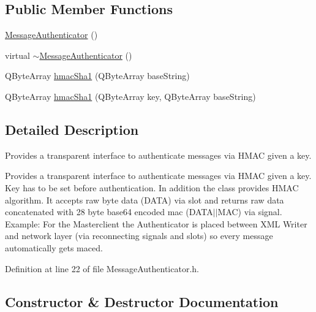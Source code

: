 \subsection*{Public Member Functions}
\begin{DoxyCompactItemize}
\item 
\hyperlink{class_message_authenticator_a173fa8bde5c0f43401a7528a46565a9b}{Message\+Authenticator} ()
\item 
virtual \hyperlink{class_message_authenticator_a035eb487443cddba078f0fa27e82e47b}{$\sim$\+Message\+Authenticator} ()
\item 
Q\+Byte\+Array \hyperlink{class_message_authenticator_ad25fd8900a040be37b82cc43a1c8206f}{hmac\+Sha1} (Q\+Byte\+Array base\+String)
\item 
Q\+Byte\+Array \hyperlink{class_message_authenticator_ae14e12c5081514a5af65bac25fe3de0c}{hmac\+Sha1} (Q\+Byte\+Array key, Q\+Byte\+Array base\+String)
\end{DoxyCompactItemize}


\subsection{Detailed Description}
Provides a transparent interface to authenticate messages via H\+M\+A\+C given a key. 

Provides a transparent interface to authenticate messages via H\+M\+A\+C given a key. Key has to be set before authentication. In addition the class provides H\+M\+A\+C algorithm. It accepts raw byte data (D\+A\+T\+A) via slot and returns raw data concatenated with 28 byte base64 encoded mac (D\+A\+T\+A$\vert$$\vert$\+M\+A\+C) via signal. Example\+: For the Masterclient the Authenticator is placed between X\+M\+L Writer and network layer (via reconnecting signals and slots) so every message automatically gets mac\textquotesingle{}ed. 

Definition at line 22 of file Message\+Authenticator.\+h.



\subsection{Constructor \& Destructor Documentation}
\hypertarget{class_message_authenticator_a173fa8bde5c0f43401a7528a46565a9b}{}
